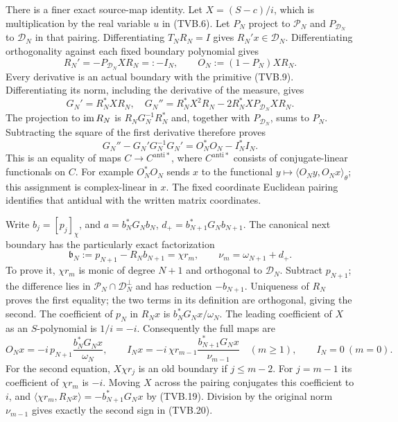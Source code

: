 There is a finer exact source-map identity. Let $X=(S-c)/i$,
which is multiplication by the real variable $u$ in (TVB.6).
Let $P_N$ project to $\mathcal P_N$ and $P_{\mathcal D_N}$ to
$\mathcal D_N$ in that pairing. Differentiating $T_NR_N=I$
gives $R_N'x\in\mathcal D_N$. Differentiating orthogonality
against each fixed boundary polynomial gives
\[
 R_N'=-P_{\mathcal D_N}XR_N=:-I_N,
 \qquad O_N:=(1-P_N)XR_N.
 \tag{TVB.17}
\]
Every derivative is an actual boundary with the primitive
(TVB.9). Differentiating its norm, including the derivative of
the measure, gives
\[
 G_N'=R_N^*XR_N,\quad
 G_N''=R_N^*X^2R_N-2R_N^*XP_{\mathcal D_N}XR_N.
\]
The projection to $\operatorname{im} R_N$ is $R_NG_N^{-1}R_N^*$ and,
together with $P_{\mathcal D_N}$, sums to $P_N$.
Subtracting the square of the first derivative therefore proves
\[
 G_N''-G_N'G_N^{-1}G_N'=O_N^*O_N-I_N^*I_N.
 \tag{TVB.18}
\]
This is an equality of maps $C\to C^{\mathrm{anti}*}$, where
$C^{\mathrm{anti}*}$ consists of conjugate-linear functionals on $C$.
For example $O_N^*O_N$ sends $x$ to the functional
$y\mapsto\langle O_Ny,O_Nx\rangle_\theta$; this assignment is
complex-linear in $x$. The fixed coordinate Euclidean pairing
identifies that antidual with the written matrix coordinates.

Write $b_j=[p_j]_\chi$, and
$a=b_N^*G_Nb_N$, $d_+=b_{N+1}^*G_Nb_{N+1}$.
The canonical next boundary has the particularly exact factorization
\[
 \mathfrak b_N:=p_{N+1}-R_Nb_{N+1}=\chi r_m,
 \qquad \nu_m=\omega_{N+1}+d_+.
 \tag{TVB.19}
\]
To prove it, $\chi r_m$ is monic of degree $N+1$ and orthogonal
to $\mathcal D_N$. Subtract $p_{N+1}$; the difference lies in
$\mathcal P_N\cap\mathcal D_N^\perp$ and has reduction
$-b_{N+1}$. Uniqueness of $R_N$ proves the first equality;
the two terms in its definition are orthogonal, giving the second.
The coefficient of $p_N$ in $R_Nx$ is $b_N^*G_Nx/\omega_N$.
The leading coefficient of $X$ as an $S$-polynomial is $1/i=-i$.
Consequently the full maps are
\[
 O_Nx=-i\,p_{N+1}\frac{b_N^*G_Nx}{\omega_N},\qquad
 I_Nx=-i\,\chi r_{m-1}\frac{b_{N+1}^*G_Nx}{\nu_{m-1}}
 \quad(m\ge1),\qquad I_N=0\ (m=0).
 \tag{TVB.20}
\]
For the second equation, $X\chi r_j$ is an old boundary if
$j\le m-2$. For $j=m-1$ its coefficient of $\chi r_m$ is
$-i$. Moving $X$ across the pairing conjugates this coefficient
to $i$, and $\langle\chi r_m,R_Nx\rangle
=-b_{N+1}^*G_Nx$ by (TVB.19). Division by the original norm
$\nu_{m-1}$ gives exactly the second sign in (TVB.20).

